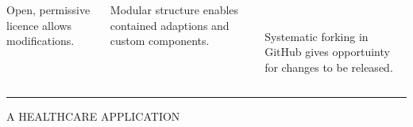 \documentclass[usenames,dvipsnames,t]{beamer}
\begin{document}
\begin{columns}
\begin{column}{0.5\textwidth}
\begin{center}
\begin{minipage}[c]{0.9\textwidth}
\begin{tcolorbox}[colback=textorange!15,colframe=textorange, title=\small{EXTENDIBLE}, coltitle=white, halign title=right]
\begin{columns}
\begin{column}{0.32\textwidth}
\begin{center}
      \end{center}
      \small{Open, permissive licence allows modifications.}
    \end{column}
    \begin{column}{0.32\textwidth}
      \begin{center}
      
      \end{center}
      \small{Modular structure enables contained adaptions and custom components.}
    \end{column}
    \begin{column}{0.32\textwidth}
      \begin{center}
      \\
      \end{center}
      \small{Systematic forking in GitHub gives opportuinty for changes to be released.}
    \end{column}
    \hspace{0.02\textwidth}
    \end{columns}
    \end{tcolorbox}
    \vspace{5mm}
  \end{minipage}
  \end{center}

\end{column}
\end{columns}

\vspace{12mm}
\textcolor{textgrey}{\hrule height 3pt}
\vspace{5mm}

\begin{center}
  \textcolor{textgrey}{\Large{A HEALTHCARE APPLICATION}\vspace{4mm}}
\end{center}
\end{document}

